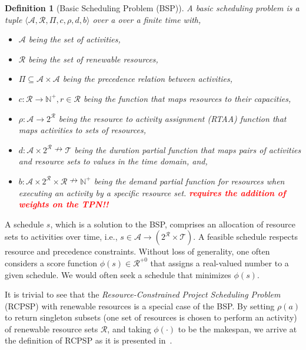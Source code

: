 \documentclass[11pt]{article}
\newcommand{\todo}[1]{\textcolor{red}{\bf {#1}}}
\newtheorem{mydef}{Definition}
\begin{document}
\begin{mydef} [Basic Scheduling Problem (BSP)] \label{def:sched}
A basic scheduling problem is a tuple $\langle  \mathcal{A}, \mathcal{R}, \varPi, c, \rho, d, b \rangle$ over a 
over a finite time 
with,
\begin{itemize}
 
	\item $\mathcal{A}$ being the set of activities,
	\item $\mathcal{R}$ being the set of renewable resources,
	\item $\varPi \subseteq \mathcal{A} \times \mathcal{A}$ being the precedence relation between activities,
	\item $c: \mathcal{R} \rightarrow  \mathbb{N}^{+}, r \in \mathcal{R}$ being the function that maps resources to their capacities, 
	\item $\rho: \mathcal{A} \rightarrow 2^{\mathcal{R}}$ being the resource to activity assignment (RTAA)  function that maps activities
	to sets of resources, 
	\item $d: \mathcal{A} \times 2^{\mathcal{R}} \nrightarrow \mathcal{T}$ being the duration partial function that maps pairs of activities and resource sets to values in the time domain, 
	and, \item $b: \mathcal{A} \times 2^{\mathcal{R}} \times \mathcal{R} \nrightarrow \mathbb{N}^{+}$ being the demand partial function for resources when 
		executing an activity by a specific resource set. \todo{requires the addition of weights on the TPN!!}
\end{itemize}
\end{mydef} \noindent A schedule $s$, which is a solution to 
the BSP, comprises an allocation of resource sets to 
activities over time, i.e., 
$s \in \mathcal{A} \rightarrow  (2^\mathcal{R} \times \mathcal{T})$. A feasible schedule respects resource and precedence constraints. Without loss of generality, one often considers a score function 
$\phi(s) \in \mathcal{R}^{+0}$ that 
assigns a real-valued number to a 
given schedule. We would often seek a 
schedule that minimizes 
$\phi(s)$.

It is trivial to see that the 
\emph{Resource-Constrained Project Scheduling Problem} 
(RCPSP) with renewable resources \cite{BRUCKER1993} is a 
special case of the BSP. By setting $\rho(a)$ to return singleton subsets (one
set of resources is chosen to perform an activity)
of renewable resource sets $\mathcal{R}$, and taking
$\phi(\cdot)$ to be the makespan, we arrive at the definition of 
RCPSP as it is presented in~\cite{BRUCKER1993}. 
\end{document}
